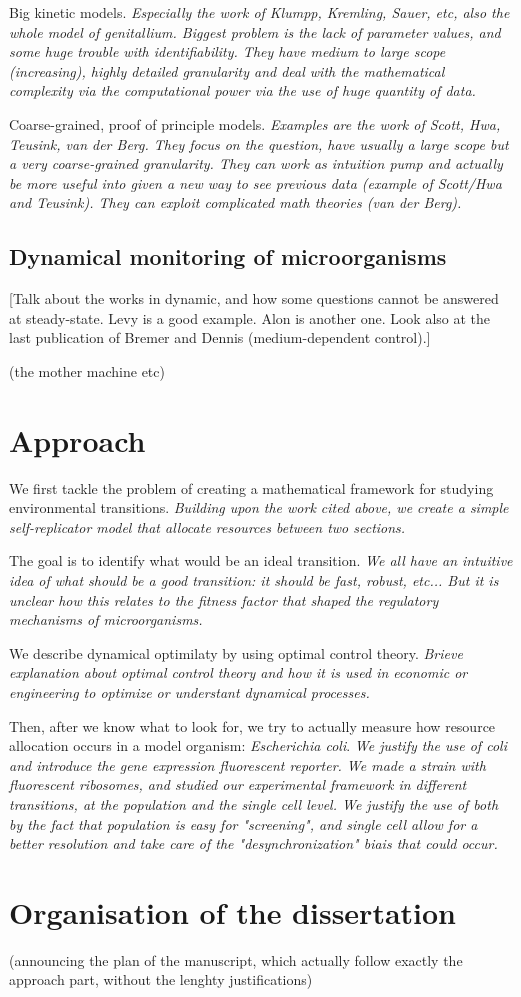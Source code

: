 Big kinetic models.
\textit{Especially the work of Klumpp, Kremling, Sauer, etc, also the whole model of genitallium.
Biggest problem is the lack of parameter values, and some huge trouble with identifiability.
They have medium to large scope (increasing), highly detailed granularity and deal with the mathematical complexity via the computational power via the use of huge quantity of data.}

Coarse-grained, proof of principle models.
\textit{Examples are the work of Scott, Hwa, Teusink, van der Berg.
They focus on the question, have usually a large scope but a very coarse-grained granularity.
They can work as intuition pump and actually be more useful into given a new way to see previous data (example of Scott/Hwa and Teusink).
They can exploit complicated math theories (van der Berg).}


\subsection{Dynamical monitoring of microorganisms}

[Talk about the works in dynamic, and how some questions cannot be answered at steady-state.
Levy is a good example. Alon is another one. Look also at the last publication of Bremer and Dennis (medium-dependent control).]

(the mother machine etc)

\section{Approach}

We first tackle the problem of creating a mathematical framework for studying environmental transitions.
\textit{Building upon the work cited above, we create a simple self-replicator model that allocate resources between two sections.}

The goal is to identify what would be an ideal transition.
\textit{We all have an intuitive idea of what should be a good transition: it should be fast, robust, etc... But it is unclear how this relates to the fitness factor that shaped the regulatory mechanisms of microorganisms.}

We describe dynamical optimilaty by using optimal control theory.
\textit{Brieve explanation about optimal control theory and how it is used in economic or engineering to optimize or understant dynamical processes.}

Then, after we know what to look for, we try to actually measure how resource allocation occurs in a model organism: \textit{Escherichia coli}.
\textit{We justify the use of coli and introduce the gene expression fluorescent reporter.
We made a strain with fluorescent ribosomes, and studied our experimental framework in different transitions, at the population and the single cell level.
We justify the use of both by the fact that population is easy for "screening", and single cell allow for a better resolution and take care of the "desynchronization" biais that could occur.}

\section{Organisation of the dissertation}

(announcing the plan of the manuscript, which actually follow exactly the approach part, without the lenghty justifications)